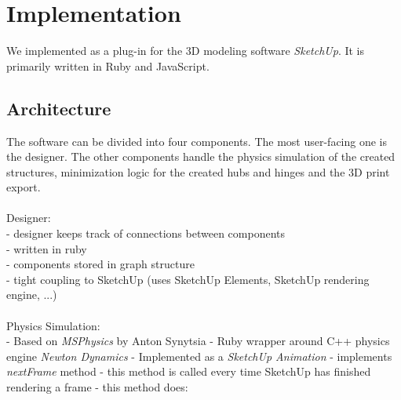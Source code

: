 \chapter{Implementation}\label{ch:implementation}
We implemented \trussFabName{} as a plug-in for the 3D modeling software \textit{SketchUp}. It is primarily written in Ruby and JavaScript.

\section{Architecture}
The software can be divided into four components. The most user-facing one is the designer. The other components handle the physics simulation of the created structures, minimization logic for the created hubs and hinges and the 3D print export.\\
\\
Designer:\\
- designer keeps track of connections between components\\
- written in ruby\\
- components stored in graph structure \\
- tight coupling to SketchUp (uses SketchUp Elements, SketchUp rendering engine, ...)\\
\\
Physics Simulation:\\
- Based on \textit{MSPhysics} by Anton Synytsia
- Ruby wrapper around C++ physics engine \textit{Newton Dynamics}
- Implemented as a \textit{SketchUp Animation}
- implements \textit{nextFrame} method
- this method is called every time SketchUp has finished rendering a frame
- this method does:
